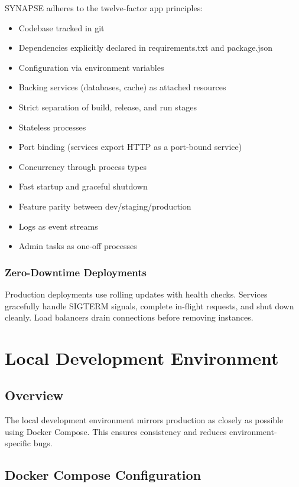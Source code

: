 \documentclass{report}
\begin{document}
SYNAPSE adheres to the twelve-factor app principles:
\begin{itemize}
  \item Codebase tracked in git
  \item Dependencies explicitly declared in requirements.txt and package.json
  \item Configuration via environment variables
  \item Backing services (databases, cache) as attached resources
  \item Strict separation of build, release, and run stages
  \item Stateless processes
  \item Port binding (services export HTTP as a port-bound service)
  \item Concurrency through process types
  \item Fast startup and graceful shutdown
  \item Feature parity between dev/staging/production
  \item Logs as event streams
  \item Admin tasks as one-off processes
\end{itemize}

\subsection{Zero-Downtime Deployments}

Production deployments use rolling updates with health checks. Services gracefully handle SIGTERM signals, complete in-flight requests, and shut down cleanly. Load balancers drain connections before removing instances.

\newpage

\chapter{Local Development Environment}

\section{Overview}

The local development environment mirrors production as closely as possible using Docker Compose. This ensures consistency and reduces environment-specific bugs.

\section{Docker Compose Configuration}
\end{document}
